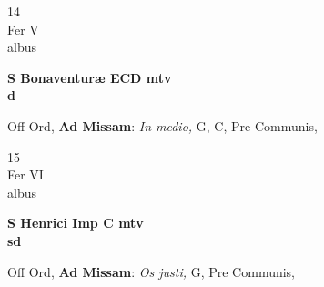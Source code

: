 \documentclass[10pt, openany]{book}
\begin{document}
        \begin{center}
            \begin{minipage}{3.5in}
                \vspace{2em}
                \begin{minipage}{0.5in}
                    {\Huge 14} \\
                    {\normalsize Fer V} \\
                    {\normalsize albus}
                \end{minipage}
                \begin{minipage}{3.0in}
                    \textbf{ \large S Bonaventuræ ECD mtv \\
                    \textnormal{\normalsize d}} \\ 
                \end{minipage}
                \begin{justify}Off Ord, \textbf{Ad Missam}: \textit{In medio,} G, C, Pre Communis,   
                \end{justify}
            \end{minipage}
        \end{center}
    
        \begin{center}
            \begin{minipage}{3.5in}
                \vspace{2em}
                \begin{minipage}{0.5in}
                    {\Huge 15} \\
                    {\normalsize Fer VI} \\
                    {\normalsize albus}
                \end{minipage}
                \begin{minipage}{3.0in}
                    \textbf{ \large S Henrici Imp C mtv \\
                    \textnormal{\normalsize sd}} \\ 
                \end{minipage}
                \begin{justify}Off Ord, \textbf{Ad Missam}: \textit{Os justi,} G, Pre Communis,   
                \end{justify}
            \end{minipage}
        \end{center}
    
\end{document}
